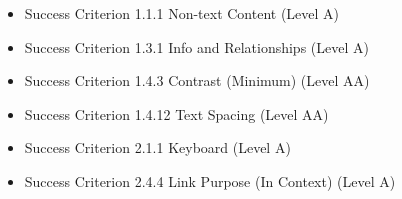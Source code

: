 \documentclass{master_thesis}
\begin{document}
\begin{itemize}
	\item Success Criterion 1.1.1 Non-text Content (Level A)

	\item Success Criterion 1.3.1 Info and Relationships (Level A)

	\item Success Criterion 1.4.3 Contrast (Minimum) (Level AA)

	\item Success Criterion 1.4.12 Text Spacing (Level AA)

	\item Success Criterion 2.1.1 Keyboard (Level A)

	\item Success Criterion 2.4.4 Link Purpose (In Context) (Level A)


\end{itemize}
\end{document}
